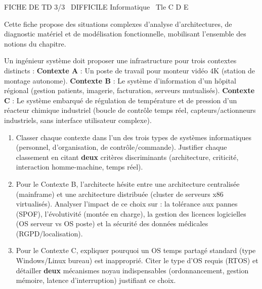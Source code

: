 \documentclass[11pt]{article}
\begin{document}
\begin{tcolorbox}[enhanced,colback=popink,colframe=popink,arc=10pt,boxrule=0pt,left=12pt,right=12pt,top=9pt,bottom=9pt]
{\color{white}\popxbold\small FICHE DE TD 3/3 \textbullet\ DIFFICILE \hfill Informatique \textbullet\ Tle C D E\par}
\end{tcolorbox}
\vspace{4pt}
Cette fiche propose des situations complexes d'analyse d'architectures, de diagnostic matériel et de modélisation fonctionnelle, mobilisant l'ensemble des notions du chapitre.

\begin{exercice}
Un ingénieur système doit proposer une infrastructure pour trois contextes distincts : 
\textbf{Contexte A} : Un poste de travail pour monteur vidéo 4K (station de montage autonome). 
\textbf{Contexte B} : Le système d'information d'un hôpital régional (gestion patients, imagerie, facturation, serveurs mutualisés). 
\textbf{Contexte C} : Le système embarqué de régulation de température et de pression d'un réacteur chimique industriel (boucle de contrôle temps réel, capteurs/actionneurs industriels, sans interface utilisateur complexe).
\begin{enumerate}
    \item Classer chaque contexte dans l'un des trois types de systèmes informatiques (personnel, d'organisation, de contrôle/commande). Justifier chaque classement en citant \textbf{deux} critères discriminants (architecture, criticité, interaction homme-machine, temps réel).
    \item Pour le Contexte B, l'architecte hésite entre une architecture centralisée (mainframe) et une architecture distribuée (cluster de serveurs x86 virtualisés). Analyser l'impact de ce choix sur : la tolérance aux pannes (SPOF), l'évolutivité (montée en charge), la gestion des licences logicielles (OS serveur vs OS poste) et la sécurité des données médicales (RGPD/localisation).
    \item Pour le Contexte C, expliquer pourquoi un OS temps partagé standard (type Windows/Linux bureau) est inapproprié. Citer le type d'OS requis (RTOS) et détailler \textbf{deux} mécanismes noyau indispensables (ordonnancement, gestion mémoire, latence d'interruption) justifiant ce choix.
\end{enumerate}
\end{exercice}
\end{document}
